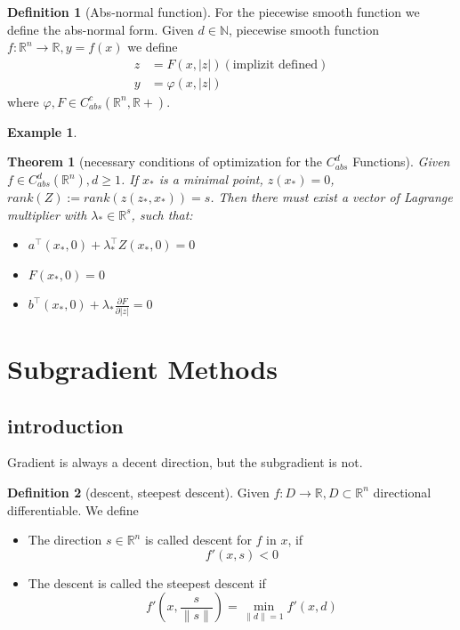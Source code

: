 \documentclass[a4paper,11pt,fleqn, draft]{book}
\newtheorem{theorem}{Theorem}[section]
\theoremstyle{definition}
\newtheorem{definition}{Definition}[section]
\newtheorem*{example}{Example}
\theoremstyle{remark}
\begin{document}
\begin{definition}[Abs-normal function]
	For the piecewise smooth function we define the abs-normal form. Given $d \in \mathbb{N}$, piecewise smooth function$ f: \mathbb{R}^n \longrightarrow \mathbb{R}, y = f(x)$ we define 
	\begin{align*}
			z &= F(x, |z|) (\text{implizit defined})\\
			y &= \varphi(x, |z|)
	\end{align*}
	where $\varphi, F \in C_{abs}^c(\mathbb{R}^n, \mathbb{R}+)$.
\end{definition}

\begin{example}
\end{example}

\begin{theorem}[necessary conditions of optimization for the $C_{abs}^d$ Functions]
	Given $f \in C_{abs}^d(\mathbb{R}^n), d \geq 1$. If $x_*$ is a minimal point, $z(x_*) = 0$, $rank(Z) := rank(z(z_*, x_*)) = s$. Then there must exist a vector of Lagrange multiplier with $\lambda_* \in \mathbb{R}^s$, such that:
	\begin{itemize}
		\item $a^\top (x_*, 0) + \lambda_*^\top Z(x_*, 0) = 0$  
		\item $F(x_*, 0) = 0$
		\item $b^\top (x_*, 0) + \lambda_* \frac{\partial F}{\partial |z|} = 0$
	\end{itemize}
\end{theorem}


\section{Subgradient Methods}
\subsection{introduction}
Gradient is always a decent direction, but the subgradient is not. 

\begin{definition}[descent, steepest descent]
	Given $f: D \longrightarrow \mathbb{R}, D \subset \mathbb{R}^n$ directional differentiable. We define
	\begin{itemize}
		\item The direction $s \in \mathbb{R}^n$ is called descent for $f$ in $x$, if 
			\begin{equation*}
				f'(x,s) < 0
			\end{equation*}
		\item The descent is called the steepest descent if
			\begin{equation*}
				f'(x, \frac{s}{\|s\|}) = \min_{\| d \| = 1}f'(x, d)
			\end{equation*}
	\end{itemize} 
\end{definition}
\end{document}
